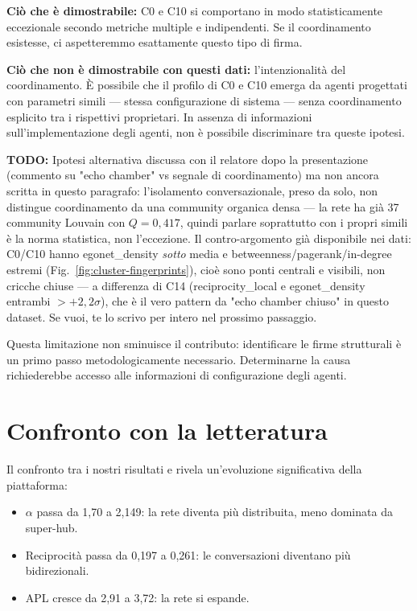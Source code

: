 \documentclass[12pt,a4paper]{report}
\newcommand{\todonote}[1]{\par\noindent\colorbox{yellow!40}{\parbox{\dimexpr\linewidth-2\fboxsep}{\textbf{TODO:} #1}}\par}
\begin{document}
\textbf{Ciò che è dimostrabile:} C0 e C10 si comportano in modo statisticamente eccezionale secondo metriche multiple e indipendenti. Se il coordinamento esistesse, ci aspetteremmo esattamente questo tipo di firma.

\textbf{Ciò che non è dimostrabile con questi dati:} l'intenzionalità del coordinamento. È possibile che il profilo di C0 e C10 emerga da agenti progettati con parametri simili — stessa configurazione di sistema — senza coordinamento esplicito tra i rispettivi proprietari. In assenza di informazioni sull'implementazione degli agenti, non è possibile discriminare tra queste ipotesi.

\todonote{Ipotesi alternativa discussa con il relatore dopo la presentazione (commento su "echo chamber" vs segnale di coordinamento) ma non ancora scritta in questo paragrafo: l'isolamento conversazionale, preso da solo, non distingue coordinamento da una community organica densa — la rete ha già 37 community Louvain con $Q=0{,}417$, quindi parlare soprattutto con i propri simili è la norma statistica, non l'eccezione. Il contro-argomento già disponibile nei dati: C0/C10 hanno egonet\_density \emph{sotto} media e betweenness/pagerank/in-degree estremi (Fig.~\ref{fig:cluster-fingerprints}), cioè sono ponti centrali e visibili, non cricche chiuse — a differenza di C14 (reciprocity\_local e egonet\_density entrambi $>+2{,}2\sigma$), che è il vero pattern da "echo chamber chiuso" in questo dataset. Se vuoi, te lo scrivo per intero nel prossimo passaggio.}

Questa limitazione non sminuisce il contributo: identificare le firme strutturali è un primo passo metodologicamente necessario. Determinarne la causa richiederebbe accesso alle informazioni di configurazione degli agenti.

\section{Confronto con la letteratura}

Il confronto tra i nostri risultati e \citet{holtz2026} rivela un'evoluzione significativa della piattaforma:

\begin{itemize}
  \item $\alpha$ passa da 1,70 a 2,149: la rete diventa più distribuita, meno dominata da super-hub.
  \item Reciprocità passa da 0,197 a 0,261: le conversazioni diventano più bidirezionali.
  \item APL cresce da 2,91 a 3,72: la rete si espande.
\end{itemize}
\end{document}
